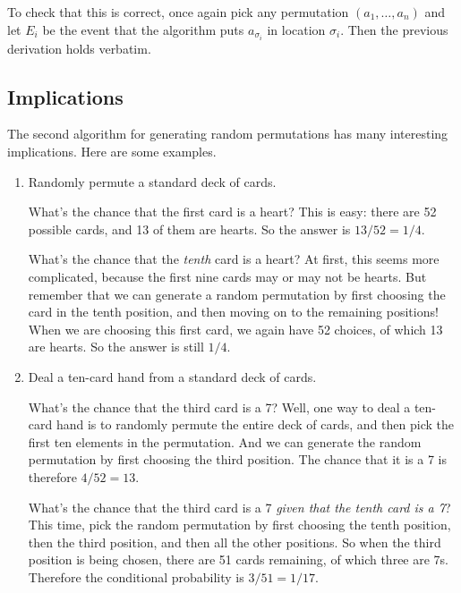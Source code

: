 \noindent
To check that this is correct, once again pick any permutation $(a_1, \ldots, a_n)$
and let $E_i$ be the event that the algorithm puts $a_{\sigma_i}$ in location $\sigma_i$.
Then the previous derivation holds verbatim.

\subsection{Implications}

The second algorithm for generating random permutations has many interesting implications.
Here are some examples.

\begin{enumerate}
\item Randomly permute a standard deck of cards.

What's the chance that the first card is a heart? This is easy: there are 52 possible cards, and 13 of them are hearts. So the answer is $13/52 = 1/4$.

What's the chance that the {\it tenth} card is a heart? At first, this seems more complicated, because the first nine cards may or may not be hearts. But remember that we can generate a random permutation by first choosing the card in the tenth position, and then moving on to the remaining positions! When we are choosing this first card, we again have 52 choices, of which 13 are hearts. So the answer is still $1/4$.

\item Deal a ten-card hand from a standard deck of cards.

What's the chance that the third card is a 7? Well, one way to deal a ten-card hand is to randomly permute the entire deck of cards, and then pick the first ten elements in the permutation. And we can generate the random permutation by first choosing the third position. The chance that it is a 7 is therefore $4/52 = 13$.

What's the chance that the third card is a 7 {\it given that the tenth card is a 7}? This time, pick the random permutation by first choosing the tenth position, then the third position, and then all the other positions. So when the third position is being chosen, there are 51 cards remaining, of which three are 7s. Therefore the conditional probability is $3/51 = 1/17$.

\end{enumerate}

